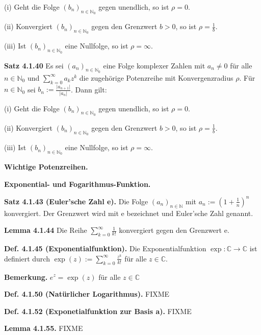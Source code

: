 (i) Geht die Folge $(b_n)_{n \in \mathbb N_0}$ gegen unendlich, so ist $\rho = 0$.

(ii) Konvergiert $(b_n)_{n \in \mathbb N_0}$ gegen den Grenzwert $b > 0$, so ist $\rho = \frac{1}{b}$.

(iii) Ist $(b_n)_{n \in \mathbb N_0}$ eine Nullfolge, so ist $\rho = \infty$.

\textbf{Satz 4.1.40} Es sei $(a_n)_{n \in \mathbb N_0}$ eine Folge komplexer Zahlen mit $a_n \neq 0$ für alle $n \in \mathbb N_0$ und $\sum_{k=0}^\infty a_k z^k$ die zugehörige Potenzreihe mit Konvergenzradius $\rho$. Für $n \in \mathbb N_0$ sei $b_n := \frac{\vert a_{n+1} \vert }{\vert a_n \vert}$. Dann gilt:

(i) Geht die Folge $(b_n)_{n \in \mathbb N_0}$ gegen unendlich, so ist $\rho = 0$.

(ii) Konvergiert $(b_n)_{n \in \mathbb N_0}$ gegen den Grenzwert $b > 0$, so ist $\rho = \frac{1}{b}$.

(iii) Ist $(b_n)_{n \in \mathbb N_0}$ eine Nullfolge, so ist $\rho = \infty$.

\textbf{Wichtige Potenzreihen.}

\textbf{Exponential- und Fogarithmus-Funktion.}

\textbf{Satz 4.1.43 (Euler’sche Zahl e).} Die Folge $(a_n)_{n \in \mathbb N}$ mit $a_n := (1+\frac{1}{n})^n$ konvergiert. Der Grenzwert wird mit e bezeichnet und Euler’sche Zahl genannt.

\textbf{Lemma 4.1.44} Die Reihe $\sum_{k=0}^\infty \frac{1}{k!}$ konvergiert gegen den Grenzwert e.

\textbf{Def. 4.1.45 (Exponentialfunktion).} Die Exponentialfunktion $\exp : \mathbb C \rightarrow \mathbb C$ ist definiert durch $\exp (z) :=  \sum_{k=0}^\infty \frac{z^k}{k!}$ für alle $z \in \mathbb C$.

\textbf{Bemerkung.} $e^z = \exp (z)$ für alle $z \in \mathbb C$

\textbf{Def. 4.1.50 (Natürlicher Logarithmus).} FIXME

\textbf{Def. 4.1.52 (Exponetialfunktion zur Basis a).} FIXME

\textbf{Lemma 4.1.55.} FIXME

